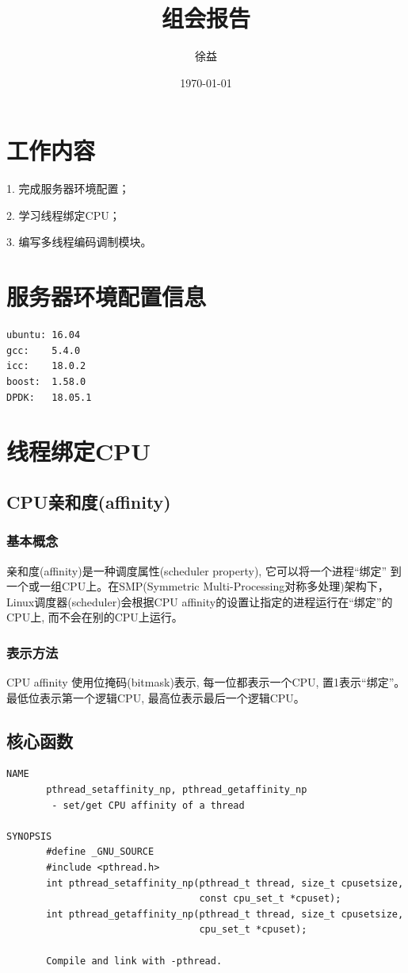 \documentclass{article}
\title{组会报告}
\author{徐益}
\date{\today}
\begin{document}
\maketitle


\section{工作内容} 
1. 完成服务器环境配置；

2. 学习线程绑定CPU；

3. 编写多线程编码调制模块。

\section{服务器环境配置信息}
\lstset{language=C++}
\begin{lstlisting}
ubuntu: 16.04
gcc:    5.4.0
icc:    18.0.2
boost:  1.58.0
DPDK:   18.05.1
\end{lstlisting}

\section{线程绑定CPU}
\subsection{CPU亲和度(affinity)}
\subsubsection{基本概念}
亲和度(affinity)是一种调度属性(scheduler property), 它可以将一个进程“绑定” 
到一个或一组CPU上。在SMP(Symmetric Multi-Processing对称多处理)架构下，
Linux调度器(scheduler)会根据CPU affinity的设置让指定的进程运行在“绑定”的CPU上,
而不会在别的CPU上运行。
\subsubsection{表示方法}
CPU affinity 使用位掩码(bitmask)表示, 每一位都表示一个CPU, 置1表示“绑定”。
最低位表示第一个逻辑CPU, 最高位表示最后一个逻辑CPU。

\subsection{核心函数}
\lstset{language=C++}
\begin{lstlisting}
NAME
	   pthread_setaffinity_np, pthread_getaffinity_np
	    - set/get CPU affinity of a thread

SYNOPSIS
       #define _GNU_SOURCE
       #include <pthread.h>
       int pthread_setaffinity_np(pthread_t thread, size_t cpusetsize,
                                  const cpu_set_t *cpuset);
       int pthread_getaffinity_np(pthread_t thread, size_t cpusetsize,
                                  cpu_set_t *cpuset);

       Compile and link with -pthread.
\end{lstlisting}
\end{document}
